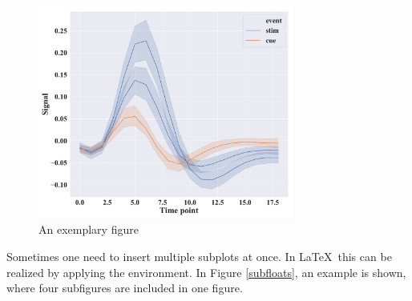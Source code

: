 	\begin{figure}[h!]
		\centering
		\includegraphics[width=0.75\textwidth]{fig_1.pdf} 
		\caption{An exemplary figure} 
		\label{fig_1} 
	\end{figure} 

	Sometimes one need to insert multiple subplots at once. In \LaTeX~this can be realized by applying the {\color{blue}{\verb|\subfloat|}} environment. In Figure \ref{subfloats}, an example is shown, where four subfigures are included in one figure.
	
